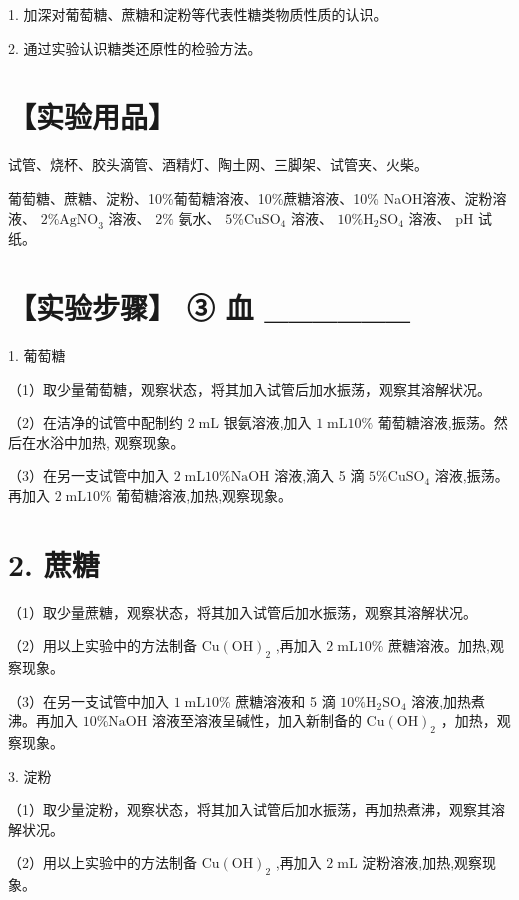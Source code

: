 \documentclass[10pt]{article}
\begin{document}
1. 加深对葡萄糖、蔗糖和淀粉等代表性糖类物质性质的认识。

2. 通过实验认识糖类还原性的检验方法。

\section*{【实验用品】}

试管、烧杯、胶头滴管、酒精灯、陶土网、三脚架、试管夹、火柴。

葡萄糖、蔗糖、淀粉、10\%葡萄糖溶液、10\%蔗糖溶液、10\% NaOH溶液、淀粉溶液、 \(2\% {\mathrm{{AgNO}}}_{3}\) 溶液、 \(2\%\) 氨水、 \(5\% {\mathrm{{CuSO}}}_{4}\) 溶液、 \({10}\% {\mathrm{H}}_{2}{\mathrm{{SO}}}_{4}\) 溶液、 \(\mathrm{{pH}}\) 试纸。

\section*{【实验步骤】 ③ 血 \_\_\_\_\_\_}

1. 葡萄糖

（1）取少量葡萄糖，观察状态，将其加入试管后加水振荡，观察其溶解状况。

（2）在洁净的试管中配制约 \(2\mathrm{\;{mL}}\) 银氨溶液,加入 \(1\mathrm{\;{mL}}{10}\%\) 葡萄糖溶液,振荡。然后在水浴中加热, 观察现象。

（3）在另一支试管中加入 \(2\mathrm{\;{mL}}{10}\% \mathrm{{NaOH}}\) 溶液,滴入 5 滴 \(5\% {\mathrm{{CuSO}}}_{4}\) 溶液,振荡。再加入 \(2\mathrm{\;{mL}}{10}\%\) 葡萄糖溶液,加热,观察现象。

\section*{2. 蔗糖}

（1）取少量蔗糖，观察状态，将其加入试管后加水振荡，观察其溶解状况。

（2）用以上实验中的方法制备 \(\mathrm{{Cu}}{\left( \mathrm{{OH}}\right) }_{2}\) ,再加入 \(2\mathrm{\;{mL}}{10}\%\) 蔗糖溶液。加热,观察现象。

（3）在另一支试管中加入 \(1\mathrm{\;{mL}}{10}\%\) 蔗糖溶液和 5 滴 \({10}\% {\mathrm{H}}_{2}{\mathrm{{SO}}}_{4}\) 溶液,加热煮沸。再加入 \({10}\% \mathrm{{NaOH}}\) 溶液至溶液呈碱性，加入新制备的 \(\mathrm{{Cu}}{\left( \mathrm{{OH}}\right) }_{2}\) ，加热，观察现象。

3. 淀粉

（1）取少量淀粉，观察状态，将其加入试管后加水振荡，再加热煮沸，观察其溶解状况。

（2）用以上实验中的方法制备 \(\mathrm{{Cu}}{\left( \mathrm{{OH}}\right) }_{2}\) ,再加入 \(2\mathrm{\;{mL}}\) 淀粉溶液,加热,观察现象。
\end{document}
